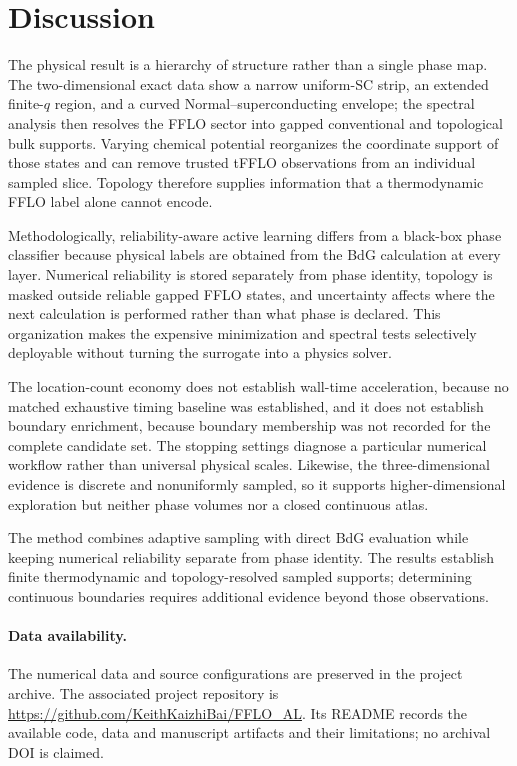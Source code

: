 \section{Discussion}
The physical result is a hierarchy of structure rather than a single phase map.  The two-dimensional exact data show a narrow uniform-SC strip, an extended finite-$q$ region, and a curved Normal--superconducting envelope; the spectral analysis then resolves the FFLO sector into gapped conventional and topological bulk supports.  Varying chemical potential reorganizes the coordinate support of those states and can remove trusted tFFLO observations from an individual sampled slice.  Topology therefore supplies information that a thermodynamic FFLO label alone cannot encode.

Methodologically, reliability-aware active learning differs from a black-box phase classifier because physical labels are obtained from the BdG calculation at every layer.  Numerical reliability is stored separately from phase identity, topology is masked outside reliable gapped FFLO states, and uncertainty affects where the next calculation is performed rather than what phase is declared.  This organization makes the expensive minimization and spectral tests selectively deployable without turning the surrogate into a physics solver.

The location-count economy does not establish wall-time acceleration, because no matched exhaustive timing baseline was established, and it does not establish boundary enrichment, because boundary membership was not recorded for the complete candidate set.  The stopping settings diagnose a particular numerical workflow rather than universal physical scales.  Likewise, the three-dimensional evidence is discrete and nonuniformly sampled, so it supports higher-dimensional exploration but neither phase volumes nor a closed continuous atlas.

The method combines adaptive sampling with direct BdG evaluation while keeping numerical reliability separate from phase identity. The results establish finite thermodynamic and topology-resolved sampled supports; determining continuous boundaries requires additional evidence beyond those observations.

\paragraph{Data availability.} The numerical data and source configurations are preserved in the project archive. The associated project repository is \url{https://github.com/KeithKaizhiBai/FFLO_AL}. Its README records the available code, data and manuscript artifacts and their limitations; no archival DOI is claimed.
